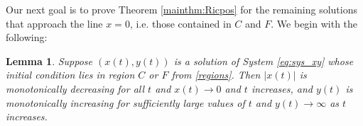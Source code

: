 \documentclass{amsart}
\numberwithin{equation}{section}
\newtheorem{corollary}[equation]{Corollary}
\newtheorem{lemma}[equation]{Lemma}
\theoremstyle{plain}
\theoremstyle{definition}
\theoremstyle{remark}
\numberwithin{table}{section}
\begin{document}


    
    
    
        
    
    
    Our next goal is to prove Theorem \ref{mainthm:Ricpos} for the remaining solutions that approach the line $x=0$, i.e. those contained in $C$ and $F$.
    We begin with the following:

    \begin{lemma}\label{lemma D}
        Suppose $(x(t),y(t))$ is a solution of System \eqref{eq:sys_xy} whose initial condition lies in region $C$ or $F$ from \eqref{regions}.
        Then $|x(t)|$ is monotonically decreasing for all $t$ and $x(t)\to 0$ and $t$ increases, and $y(t)$ is monotonically increasing for sufficiently large values of $t$ and $y(t) \to \infty$ as $t$ increases.
    \end{lemma}

\end{document}
